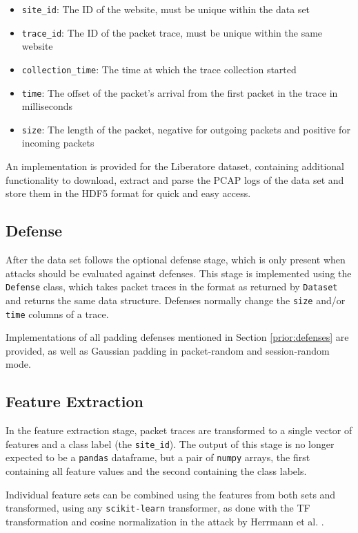 \documentclass[
	ruledheaders=chapter,
	class=report,
	thesis={type=master, department=inf},
	accentcolor=1c,
	custommargins=true,
	marginpar=false,
	parskip=half-,
	fontsize=11pt,
]{tudapub}
\begin{document}
	\begin{itemize}
		\item \texttt{site\_id}: The ID of the website, must be unique within the data set
		\item \texttt{trace\_id}: The ID of the packet trace, must be unique within the same website
		\item \texttt{collection\_time}: The time at which the trace collection started
		\item \texttt{time}: The offset of the packet's arrival from the first packet in the trace in milliseconds
		\item \texttt{size}: The length of the packet, negative for outgoing packets and positive for incoming packets
	\end{itemize}

	An implementation is provided for the Liberatore dataset, containing additional functionality to download, extract and parse the PCAP logs of the data set and store them in the HDF5 format for quick and easy access.
	
	\subsection{Defense}
	
	After the data set follows the optional defense stage, which is only present when attacks should be evaluated against defenses. This stage is implemented using the \texttt{Defense} class, which takes packet traces in the format as returned by \texttt{Dataset} and returns the same data structure. Defenses normally change the \texttt{size} and/or \texttt{time} columns of a trace.
	
	Implementations of all padding defenses mentioned in Section \ref{prior:defenses} are provided, as well as Gaussian padding in packet-random and session-random mode.
	
	\subsection{Feature Extraction}
	
	In the feature extraction stage, packet traces are transformed to a single vector of features and a class label (the \texttt{site\_id}). The output of this stage is no longer expected to be a \texttt{pandas} dataframe, but a pair of \texttt{numpy} arrays, the first containing all feature values and the second containing the class labels.
	
	Individual feature sets can be combined using the features from both sets and transformed, using any \texttt{scikit-learn} transformer, as done with the TF transformation and cosine normalization in the attack by Herrmann et al. \cite{Herrmann2009}.
	
\end{document}
